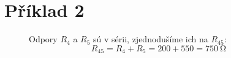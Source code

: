 \section{Příklad 2}

\begin{figure}[!ht]
\begin{center}
    
    Odpory $R_4$ a $R_5$ sú v sérii, zjednodušíme ich na $R_{45}$:
    \[
        R_{45} = R_4 + R_5 = 200 + 550 = \SI{750}{\ohm}
    \]
\end{center}
\end{figure}
